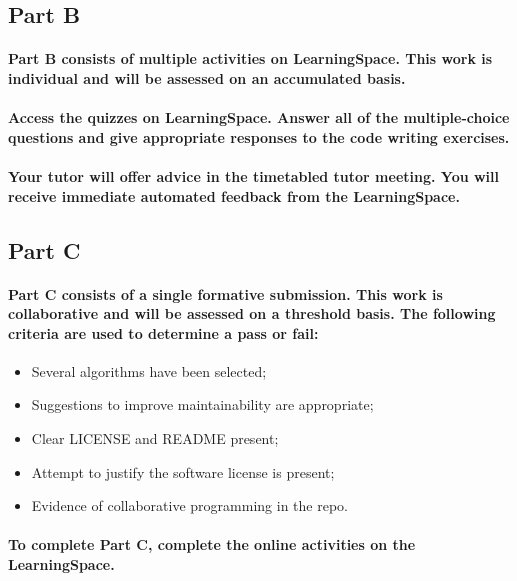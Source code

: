 \documentclass{../../fal_assignment}
\begin{document}
\subsection*{Part B}

\paragraph{Part B consists of \textbf{multiple} activities on LearningSpace. This work is \textbf{individual} and will be assessed on an \textbf{accumulated} basis.}

\paragraph{Access the quizzes on LearningSpace. Answer all of the multiple-choice questions and give appropriate responses to the code writing exercises.}

\paragraph{Your tutor will offer advice in the timetabled tutor meeting. You will receive immediate \textbf{automated feedback} from the LearningSpace.}

\subsection*{Part C}

\paragraph{Part C consists of a \textbf{single formative submission}. This work is \textbf{collaborative} and will be assessed on a \textbf{threshold} basis. The following criteria are used to determine a pass or fail:}

\begin{itemize}
	\item Several algorithms have been selected;
	\item Suggestions to improve maintainability are appropriate;
	\item Clear LICENSE and README present;
	\item Attempt to justify the software license is present;
	\item Evidence of collaborative programming in the repo.
\end{itemize}

\paragraph{To complete Part C, complete the online activities on the LearningSpace.}
\end{document}
